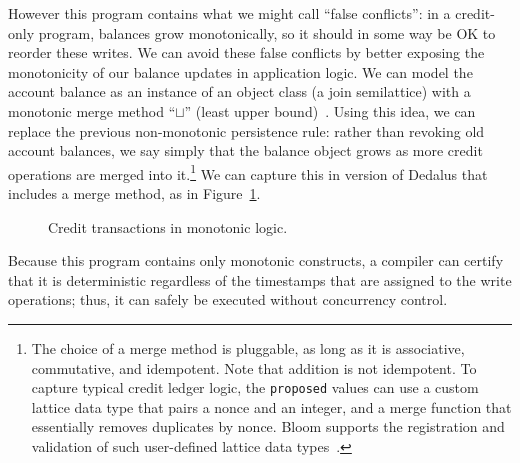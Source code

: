 \documentclass{sig-alternate}
\begin{document}
However this program contains what we might call ``false conflicts'': in a credit-only program, balances grow monotonically, so it should in some way be OK to reorder these writes.  We can avoid these false conflicts by better exposing the monotonicity of our balance updates in application logic. We
can model the account balance as an instance of an object class (a join semilattice) with a monotonic merge method ``$\sqcup$'' (least upper bound)~\cite{Conway2012}. Using this idea, we can replace the previous non-monotonic persistence rule: rather than revoking old account balances,
we say simply that the balance object grows as more credit operations are merged into it.\footnote{The choice of a merge method is pluggable, as long as it is associative, commutative, and idempotent. Note that addition is not idempotent.  To capture typical credit ledger logic, the \texttt{proposed} values can use a custom lattice data type that pairs a nonce and an integer, and a merge function that essentially removes duplicates by nonce.  Bloom supports the registration and validation of such user-defined lattice data types~\cite{Conway2012}.}  We can capture this in version of Dedalus that includes a merge method, as in Figure~\ref{fig:lattice_balance}.

\begin{figure}[h]
\begin{scriptsize}

\centering
\vspace{-10pt}
\caption{Credit transactions in monotonic logic.}
\label{fig:lattice_balance}
\end{scriptsize}
\vspace{-2pt}
\end{figure}

\noindent
Because this program contains only monotonic constructs, a compiler can 
certify that it is deterministic regardless of the timestamps that are
assigned to the write operations; thus, it can safely be executed without
concurrency control. 
\end{document}
